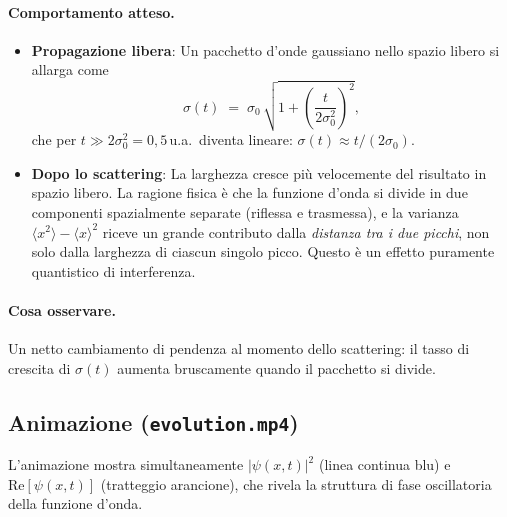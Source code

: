 \documentclass[12pt, a4paper]{article}
\begin{document}
\paragraph{Comportamento atteso.}
\begin{itemize}
  \item \textbf{Propagazione libera}: Un pacchetto d'onde gaussiano nello
        spazio libero si allarga come
        \begin{equation}
          \sigma(t) \;=\; \sigma_0\,\sqrt{1 + \left(\frac{t}{2\sigma_0^2}\right)^2},
          \label{eq:spreading}
        \end{equation}
        che per $t \gg 2\sigma_0^2 = 0{,}5$\,u.a.\ diventa lineare:
        $\sigma(t) \approx t/(2\sigma_0)$.

  \item \textbf{Dopo lo scattering}: La larghezza cresce più velocemente
        del risultato in spazio libero. La ragione fisica è che la funzione
        d'onda si divide in due componenti spazialmente separate (riflessa
        e trasmessa), e la varianza $\langle x^2\rangle - \langle x\rangle^2$
        riceve un grande contributo dalla \emph{distanza tra i due picchi},
        non solo dalla larghezza di ciascun singolo picco. Questo è un
        effetto puramente quantistico di interferenza.
\end{itemize}

\paragraph{Cosa osservare.}
Un netto cambiamento di pendenza al momento dello scattering: il tasso di
crescita di $\sigma(t)$ aumenta bruscamente quando il pacchetto si divide.

\subsection{Animazione (\texttt{evolution.mp4})}

L'animazione mostra simultaneamente $|\psi(x,t)|^2$ (linea continua blu) e
$\mathrm{Re}[\psi(x,t)]$ (tratteggio arancione), che rivela la struttura di
fase oscillatoria della funzione d'onda.
\end{document}
